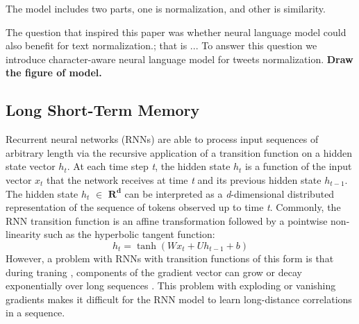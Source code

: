 \documentclass[letterpaper]{article}
\begin{document}
The model includes two parts, one is normalization, and other is similarity.

The question that inspired this paper was whether neural language model could also benefit for text normalization.; that is ... To answer this question we introduce character-aware neural language model for tweets normalization.  \textbf{Draw the figure of model.}

\subsection{Long Short-Term Memory}
Recurrent neural networks (RNNs) are able to process input sequences of arbitrary length via the recursive application of a transition function on a hidden state vector \textit{$h_{t}$}. At each time step \textit{t}, the hidden state \textit{$h_{t}$} is a function of the input vector \textit{$x_{t}$} that the network receives at time \textit{t} and its previous hidden state \textit{$h_{t-1}$}. The hidden state \textit{$h_{t}$} $\in$ $\mathbf{R^{d}}$ can be interpreted as a \textit{d}-dimensional distributed representation of the sequence of tokens observed up to time \textit{t}. Commonly, the RNN transition function is an affine transformation followed by a pointwise non-linearity such as the hyperbolic tangent function:
\begin{equation}\label{rnn}
h_{t} = \tanh(Wx_{t}+Uh_{t-1}+b)
\end{equation}
However, a problem with RNNs with transition functions of this form is that during traning , components of the gradient vector can grow or decay exponentially over long sequences \cite{Hochreiter:1998:VGP:353515.355233}. This problem with exploding or vanishing gradients makes it difficult for the RNN model to learn long-distance correlations in a sequence.
\end{document}
